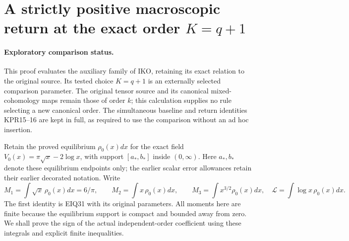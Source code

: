 \section{A strictly positive macroscopic return at the exact order $K=q+1$}
\label{sec:KPR}

\paragraph{Exploratory comparison status.}
This proof evaluates the auxiliary family of IKO, retaining its exact
relation to the original source. Its tested choice $K=q+1$ is an
externally selected comparison parameter. The original tensor source
and its canonical mixed-cohomology maps remain those of order $k$;
this calculation supplies no rule selecting a new canonical order.
The simultaneous baseline and return identities KPR15--16 are kept
in full, as required to use the comparison without an ad hoc insertion.

Retain the proved equilibrium $\rho_0(x)dx$ for the exact field
$V_0(x)=\pi\sqrt x-2\log x$, with support $[a_*,b_*]$ inside
$(0,\infty)$. Here $a_*,b_*$ denote these equilibrium endpoints
only; the earlier scalar error allowances retain their earlier
decorated notation. Write
\[
 M_1=\int\sqrt x\,\rho_0(x)dx=6/\pi,\qquad
 M_2=\int x\,\rho_0(x)dx,\qquad
 M_3=\int x^{3/2}\rho_0(x)dx,
 \quad\mathcal L=\int\log x\,\rho_0(x)dx.
 \tag{KPR1}
\]
The first identity is EIQ31 with its original parameters. All moments
here are finite because the equilibrium support is compact and bounded
away from zero. We shall prove the sign of the actual independent-order
coefficient using these integrals and explicit finite inequalities.

